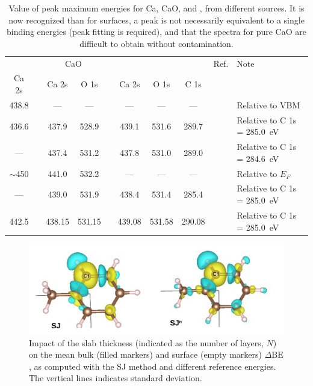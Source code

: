 \documentclass[journal=jpccck,manuscript=article]{achemso}
\def\dbe{\ensuremath{\Delta\text{BE}}}
\begin{document}
\begin{table}[!h]
	\begin{tabular}{c ccc c ccc cl}
		\toprule
		\ce{Ca^0} & & \multicolumn{2}{c}{CaO} & & \multicolumn{3}{c}{\ce{CaCO3}} & Ref. & Note\\
		\cline{1-1} \cline{3-4} \cline{6-8}
		Ca 2s & & Ca 2s & O 1s  & & Ca 2s & O 1s & C 1s\\
		\midrule
		438.8 & &---&---&& --- & --- &--- & \citenum{fuggleCorelevelBindingEnergies1980} & Relative to VBM\\
		436.6 & & 437.9 & 528.9& & 439.1 &531.6 & 289.7& \citenum{sosulnikovXrayPhotoelectronStudies1992}& Relative to C 1s = \SI{285.0}{\electronvolt}\\
		 --- && 437.4 & 531.2&& 437.8 & 531.0 & 289.0 & \citenum{demriXPSStudyCalcium1995} & Relative to C 1s = \SI{284.6}{\electronvolt}\\
		 $\sim$450 & & 441.0 & 532.2 & & --- & --- & --- & \citenum{ochsCO2ChemisorptionCa1998} & Relative to $E_F$ \\
		 --- & & 439.0 & 531.9 & & 438.4 & 531.4 & 285.4 & \citenum{cristHandbookMonochromaticXPS2000a} & Relative to C 1s = \SI{285.0}{\electronvolt}\\
		 442.5 & & 438.15 & 531.15 & & 439.08 & 531.58 & 290.08 & \citenum{cristXPSLibraryWebsite2021a} & Relative to C 1s = \SI{285.0}{\electronvolt}\\
		\bottomrule
	\end{tabular}
	\caption{Value of peak maximum energies for Ca, CaO, and  , from different sources. It is now recognized than for surfaces, a peak is not necessarily equivalent to a single binding energies (peak fitting is required), and that the spectra for pure CaO are difficult to obtain without contamination.\cite{dupinSystematicXPSStudies2000}}
\end{table}

\begin{figure}[!h]
\centering
\includegraphics[width=\linewidth]{FigureS3}
\caption{Impact of the slab thickness (indicated as the number of layers, $N$) on the mean bulk (filled markers)  and surface (empty markers) \dbe{}, as computed with the SJ method and different reference energies. The vertical lines indicates standard deviation.}
\label{fig:slabsthicknessSJ}
\end{figure}
\end{document}
